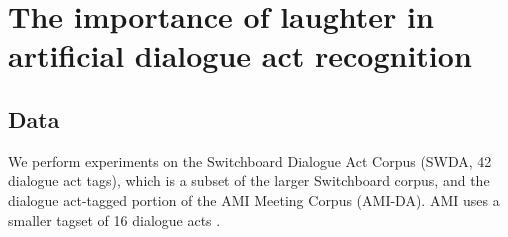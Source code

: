 \documentclass[11pt,a4paper]{article}
\begin{document}


%







\section{The importance of laughter in artificial dialogue act recognition}
\label{sec:dar}


\subsection{Data}\label{sec:data}
We perform experiments on the Switchboard Dialogue Act Corpus (SWDA,
42 dialogue act tags), which is a subset of the larger Switchboard
corpus, and the dialogue act-tagged portion of the AMI Meeting Corpus
(AMI-DA).  AMI uses a smaller tagset of 16 dialogue acts
\citep{GuidelinesDialogueAct2005}.
\end{document}
